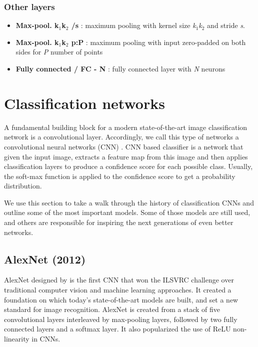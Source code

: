 \subsubsection*{Other layers}
\begin{itemize}
    \item \textbf{Max-pool. k$_1$\x k$_2$ /s} : maximum pooling with kernel size \textit{k$_1$\x k$_2$} and stride \textit{s}.
    
    \item \textbf{Max-pool. k$_1$\x k$_2$ p:P} : maximum pooling with
 input zero-padded on both sides for \textit{P} number of points
 
    \item \textbf{Fully connected / FC - N} : fully connected layer with \textit{N} neurons
\end{itemize}

\section{Classification networks}
\label{sec:clsnets}
A fundamental building block for a modern state-of-the-art image classification network is a convolutional layer. Accordingly, we call this type of networks a convolutional neural networks (CNN) \cite[ch.~9]{bib:dlbook}. CNN based classifier is a network that given the input image, extracts a feature map from this image and then applies classification layers to produce a confidence score for each possible class. Usually, the soft-max function is applied to the confidence score to get a probability distribution.

We use this section to take a walk through the history of classification CNNs and outline some of the most important models. Some of those models are still used, and others are responsible for inspiring the next generations of even better networks.

\subsection{AlexNet (2012)}
AlexNet designed by \citeauthor{bib:alexnet} \cite{bib:alexnet} is the first CNN that won the ILSVRC challenge over traditional computer vision and machine learning approaches. It created a foundation on which today's state-of-the-art models are built, and set a new standard for image recognition. AlexNet is created from a stack of five convolutional layers interleaved by max-pooling layers, followed by two fully connected layers and a softmax layer. It also popularized the use of ReLU non-linearity in CNNs.

